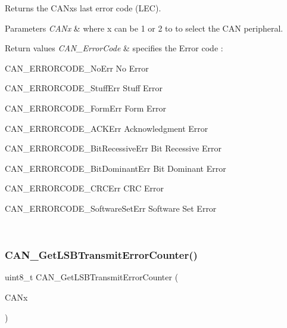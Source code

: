 Returns the C\+A\+Nx\textquotesingle{}s last error code (L\+EC). 


\begin{DoxyParams}{Parameters}
{\em C\+A\+Nx} & where x can be 1 or 2 to to select the C\+AN peripheral.\\
\hline
\end{DoxyParams}

\begin{DoxyRetVals}{Return values}
{\em C\+A\+N\+\_\+\+Error\+Code} & specifies the Error code \+:
\begin{DoxyItemize}
\item C\+A\+N\+\_\+\+E\+R\+R\+O\+R\+C\+O\+D\+E\+\_\+\+No\+Err No Error
\item C\+A\+N\+\_\+\+E\+R\+R\+O\+R\+C\+O\+D\+E\+\_\+\+Stuff\+Err Stuff Error
\item C\+A\+N\+\_\+\+E\+R\+R\+O\+R\+C\+O\+D\+E\+\_\+\+Form\+Err Form Error
\item C\+A\+N\+\_\+\+E\+R\+R\+O\+R\+C\+O\+D\+E\+\_\+\+A\+C\+K\+Err Acknowledgment Error
\item C\+A\+N\+\_\+\+E\+R\+R\+O\+R\+C\+O\+D\+E\+\_\+\+Bit\+Recessive\+Err Bit Recessive Error
\item C\+A\+N\+\_\+\+E\+R\+R\+O\+R\+C\+O\+D\+E\+\_\+\+Bit\+Dominant\+Err Bit Dominant Error
\item C\+A\+N\+\_\+\+E\+R\+R\+O\+R\+C\+O\+D\+E\+\_\+\+C\+R\+C\+Err C\+RC Error
\item C\+A\+N\+\_\+\+E\+R\+R\+O\+R\+C\+O\+D\+E\+\_\+\+Software\+Set\+Err Software Set Error 
\end{DoxyItemize}\\
\hline
\end{DoxyRetVals}
\mbox{\label{group___c_a_n___exported___functions_ga85ee0c35bf7ca15d4e4c862eef534843}} 
\subsubsection{\texorpdfstring{CAN\_GetLSBTransmitErrorCounter()}{CAN\_GetLSBTransmitErrorCounter()}}
{\footnotesize\ttfamily uint8\+\_\+t C\+A\+N\+\_\+\+Get\+L\+S\+B\+Transmit\+Error\+Counter (\begin{DoxyParamCaption}\item[{\mbox{\hyperlink{struct_c_a_n___type_def}{C\+A\+N\+\_\+\+Type\+Def}} $\ast$}]{C\+A\+Nx }\end{DoxyParamCaption})}



